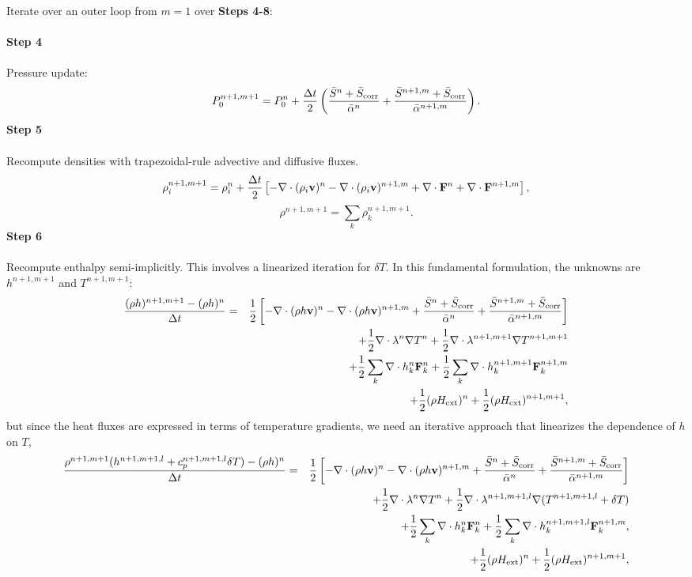 \documentclass[final]{siamltex}
\def\Fb {{\bf F}}
\def\vb {{\bf v}}
\def\Hext {H_{\rm ext}}
\def\half   {\frac{1}{2}}
\begin{document}
Iterate over an outer loop from $m=1$ over {\bf Steps 4-8}:\\ \\
{\bf Step 4}\\ \\
Pressure update:
\begin{equation}
P_0^{n+1,m+1} = P_0^n + \frac{\Delta t}{2}\left(\frac{\bar{S}^n + \bar{S}_{\rm corr}}{\bar{\alpha}^n} + \frac{\bar{S}^{n+1,m} + \bar{S}_{\rm corr}}{\bar{\alpha}^{n+1,m}}\right).
\end{equation}
{\bf Step 5}\\ \\
Recompute densities with trapezoidal-rule advective and diffusive fluxes.
\begin{equation}
\rho_i^{n+1,m+1} = \rho_i^n + \frac{\Delta t}{2}\left[-\nabla\cdot(\rho_i\vb)^n -\nabla\cdot(\rho_i\vb)^{n+1,m} + \nabla\cdot\Fb^n + \nabla\cdot\Fb^{n+1,m}\right],
\end{equation}
\begin{equation}
\rho^{n+1,m+1} = \sum_k\rho_k^{n+1,m+1}.
\end{equation}
{\bf Step 6}\\ \\
Recompute enthalpy semi-implicitly.  This involves a linearized iteration 
for $\delta T$.  In this fundamental formulation, the unknowns 
are $h^{n+1,m+1}$ and $T^{n+1,m+1}$:
\begin{eqnarray}
\frac{(\rho h)^{n+1,m+1} - (\rho h)^n}{\Delta t} &=& \half\left[-\nabla\cdot(\rho h\vb)^n -\nabla\cdot(\rho h\vb)^{n+1,m} + \frac{\bar{S}^n + \bar{S}_{\rm corr}}{\bar{\alpha}^n} + \frac{\bar{S}^{n+1,m}+ \bar{S}_{\rm corr}}{\bar{\alpha}^{n+1,m}}\right]\nonumber\\
&&+ \half\nabla\cdot\lambda^n\nabla T^n + \half\nabla\cdot\lambda^{n+1,m+1}\nabla T^{n+1,m+1}\nonumber\\
&&+ \half\sum_k\nabla\cdot h_k^n\Fb_k^n + \half\sum_k\nabla\cdot h_k^{n+1,m+1}\Fb_k^{n+1,m}\nonumber\\
&&+ \half(\rho\Hext)^n + \half(\rho\Hext)^{n+1,m+1},
\end{eqnarray}
but since the heat fluxes are expressed in terms of temperature gradients, we
need an iterative approach that linearizes the dependence of $h$ on $T$,
\begin{eqnarray}
\frac{\rho^{n+1,m+1}(h^{n+1,m+1,l} + c_p^{n+1,m+1,l}\delta T) - (\rho h)^n}{\Delta t} &=& \half\left[-\nabla\cdot(\rho h\vb)^n -\nabla\cdot(\rho h\vb)^{n+1,m} + \frac{\bar{S}^n + \bar{S}_{\rm corr}}{\bar{\alpha}^n} + \frac{\bar{S}^{n+1,m}+ \bar{S}_{\rm corr}}{\bar{\alpha}^{n+1,m}}\right]\nonumber\\
&&\hspace{-1in} + \half\nabla\cdot\lambda^n\nabla T^n + \half\nabla\cdot\lambda^{n+1,m+1,l}\nabla(T^{n+1,m+1,l} + \delta T)\nonumber\\
&&\hspace{-1in} + \half\sum_k\nabla\cdot h_k^n \Fb_k^n + \half\sum_k\nabla\cdot h_k^{n+1,m+1,l} \Fb_k^{n+1,m},\nonumber\\
&&\hspace{-1in} + \half(\rho\Hext)^n + \half(\rho\Hext)^{n+1,m+1},
\end{eqnarray}
\end{document}
